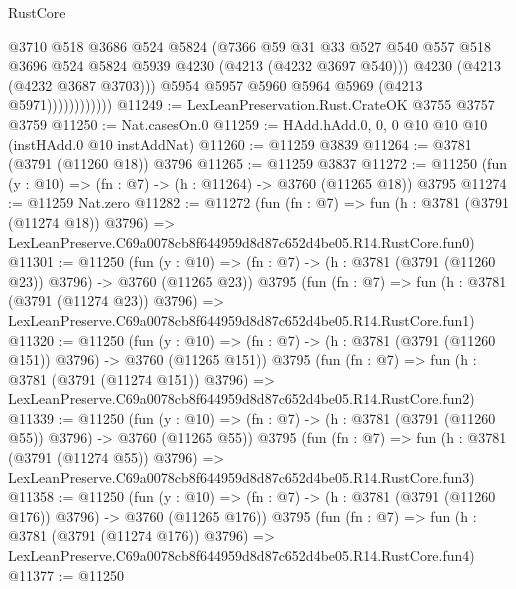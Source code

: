 \begin{lexlean}{RustCore}
\begin{coremodule}
                            @3710
                            @518
                            @3686
                            @524
                            @5824
                            (@7366
                              @59
                              @31
                              @33
                              @527
                              @540
                              @557
                              @518
                              @3696
                              @524
                              @5824
                              @5939
                              @4230
                              (@4213 (@4232 @3697 @540)))
                            @4230
                            (@4213 (@4232 @3687 @3703)))
                          @5954
                          @5957
                          @5960
                          @5964
                          @5969
                          (@4213 @5971))))))))))))
@11249 := LexLeanPreservation.Rust.CrateOK @3755 @3757 @3759
@11250 := Nat.casesOn.{0}
@11259 := HAdd.hAdd.{0, 0, 0} @10 @10 @10 (instHAdd.{0} @10 instAddNat)
@11260 := @11259 @3839
@11264 := @3781 (@3791 (@11260 @18)) @3796
@11265 := @11259 @3837
@11272 := @11250 (fun (y : @10) => (fn : @7) -> (h : @11264) -> @3760 (@11265 @18)) @3795
@11274 := @11259 Nat.zero
@11282 := @11272
    (fun (fn : @7) =>
    fun (h : @3781 (@3791 (@11274 @18)) @3796) =>
    LexLeanPreserve.C69a0078cb8f644959d8d87c652d4be05.R14.RustCore.fun0)
@11301 := @11250
    (fun (y : @10) => (fn : @7) -> (h : @3781 (@3791 (@11260 @23)) @3796) -> @3760 (@11265 @23))
    @3795
    (fun (fn : @7) =>
    fun (h : @3781 (@3791 (@11274 @23)) @3796) =>
    LexLeanPreserve.C69a0078cb8f644959d8d87c652d4be05.R14.RustCore.fun1)
@11320 := @11250
    (fun (y : @10) => (fn : @7) -> (h : @3781 (@3791 (@11260 @151)) @3796) -> @3760 (@11265 @151))
    @3795
    (fun (fn : @7) =>
    fun (h : @3781 (@3791 (@11274 @151)) @3796) =>
    LexLeanPreserve.C69a0078cb8f644959d8d87c652d4be05.R14.RustCore.fun2)
@11339 := @11250
    (fun (y : @10) => (fn : @7) -> (h : @3781 (@3791 (@11260 @55)) @3796) -> @3760 (@11265 @55))
    @3795
    (fun (fn : @7) =>
    fun (h : @3781 (@3791 (@11274 @55)) @3796) =>
    LexLeanPreserve.C69a0078cb8f644959d8d87c652d4be05.R14.RustCore.fun3)
@11358 := @11250
    (fun (y : @10) => (fn : @7) -> (h : @3781 (@3791 (@11260 @176)) @3796) -> @3760 (@11265 @176))
    @3795
    (fun (fn : @7) =>
    fun (h : @3781 (@3791 (@11274 @176)) @3796) =>
    LexLeanPreserve.C69a0078cb8f644959d8d87c652d4be05.R14.RustCore.fun4)
@11377 := @11250

\end{coremodule}
\end{lexlean}
